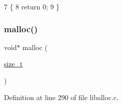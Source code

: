 \begin{DoxyCode}
7                       \{
8     \textcolor{keywordflow}{return} 0;
9 \}
\end{DoxyCode}
\mbox{\label{a00038_a1c8580582aae58105f16108d4ec89e9a_a1c8580582aae58105f16108d4ec89e9a}} 
\subsubsection{\texorpdfstring{malloc()}{malloc()}}
{\footnotesize\ttfamily void$\ast$ malloc (\begin{DoxyParamCaption}\item[{\hyperlink{a00038_a7c94ea6f8948649f8d181ae55911eeaf_a7c94ea6f8948649f8d181ae55911eeaf}{size\+\_\+t}}]{ }\end{DoxyParamCaption})}



Definition at line 290 of file liballoc.\+c.


